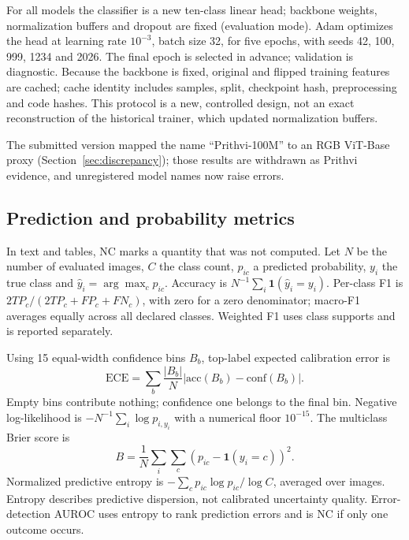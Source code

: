 \documentclass[3p,times,procedia]{elsarticle}
\newcommand{\NC}{\textsc{NC}}
\begin{document}
For all models the classifier is a new ten-class linear head; backbone weights, normalization buffers and dropout are fixed (evaluation mode). Adam optimizes the head at learning rate $10^{-3}$, batch size 32, for five epochs, with seeds 42, 100, 999, 1234 and 2026. The final epoch is selected in advance; validation is diagnostic. Because the backbone is fixed, original and flipped training features are cached; cache identity includes samples, split, checkpoint hash, preprocessing and code hashes. This protocol is a new, controlled design, not an exact reconstruction of the historical trainer, which updated normalization buffers.

The submitted version mapped the name ``Prithvi-100M'' to an RGB ViT-Base proxy (Section~\ref{sec:discrepancy}); those results are withdrawn as Prithvi evidence, and unregistered model names now raise errors.

\subsection{Prediction and probability metrics}\label{sec:metrics}
In text and tables, \NC{} marks a quantity that was not computed.
Let $N$ be the number of evaluated images, $C$ the class count, $p_{ic}$ a predicted probability, $y_i$ the true class and $\hat y_i=\arg\max_c p_{ic}$. Accuracy is $N^{-1}\sum_i\mathbf{1}(\hat y_i=y_i)$. Per-class F1 is $2TP_c/(2TP_c+FP_c+FN_c)$, with zero for a zero denominator; macro-F1 averages equally across all declared classes. Weighted F1 uses class supports and is reported separately.

Using 15 equal-width confidence bins $B_b$, top-label expected calibration error is \cite{calibration}
\begin{equation}\mathrm{ECE}=\sum_b\frac{|B_b|}{N}|\mathrm{acc}(B_b)-\mathrm{conf}(B_b)|.\label{eq:ece}\end{equation}
Empty bins contribute nothing; confidence one belongs to the final bin. Negative log-likelihood is $-N^{-1}\sum_i\log p_{i,y_i}$ with a numerical floor $10^{-15}$. The multiclass Brier score is \cite{brier}
\begin{equation}B=\frac1N\sum_i\sum_c(p_{ic}-\mathbf{1}(y_i=c))^2.\label{eq:brier}\end{equation}
Normalized predictive entropy is $-\sum_c p_{ic}\log p_{ic}/\log C$, averaged over images. Entropy describes predictive dispersion, not calibrated uncertainty quality. Error-detection AUROC uses entropy to rank prediction errors and is \NC{} if only one outcome occurs.
\end{document}
